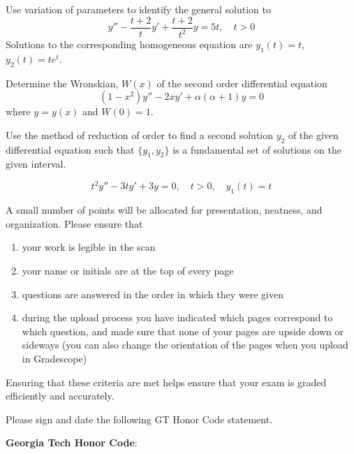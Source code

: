\documentclass[12pt]{exam}
\begin{document}
\begin{questions}
    \newpage \InitialsLeft

    \question[8] Use variation of parameters to identify the general solution to $$y'' - \frac{t+2}{t}y' + \frac{t+2}{t^2}y = 5t, \quad t > 0$$ Solutions to the corresponding homogeneous equation are $y_1(t) = t$, $y_2(t) = te^t$. 
    
    
    \newpage \InitialsLeft
    
    \question[3] Determine the Wronskian, $W(x)$ of the second order differential equation $$(1-x^2)y''-2xy'+\alpha(\alpha+1) y =0$$ where $y=y(x)$ and $W(0) = 1$. 
    
    \newpage \InitialsLeft
    
    \question[7] Use the method of reduction of order to find a second solution $y_2$ of the given differential equation such that $\{ y_1 , y_2 \}$ is a fundamental set of solutions on the given interval.
    
    $$t^2y'' - 3ty' + 3y = 0, \quad t > 0, \quad y_1(t) = t$$
    
    \newpage \InitialsLeft
    

    \question[2] A small number of points will be allocated for presentation, neatness, and organization. Please ensure that
    \begin{enumerate}
        \item your work is legible in the scan
        \item your name or initials are at the top of every page
        \item questions are answered in the order in which they were given
        \item during the upload process you have indicated which pages correspond to which question, and made sure that none of your pages are upside down or sideways (you can also change the orientation of the pages when you upload in Gradescope)
    \end{enumerate}
    Ensuring that these criteria are met helps ensure that your exam is graded efficiently and accurately. 
    


    
\end{questions}
    
    Please sign and date the following GT Honor Code statement. \\ 
    \vspace{2pt}
    
    \textbf{Georgia Tech Honor Code}:\ \GTHonorCode
    
\end{document}
